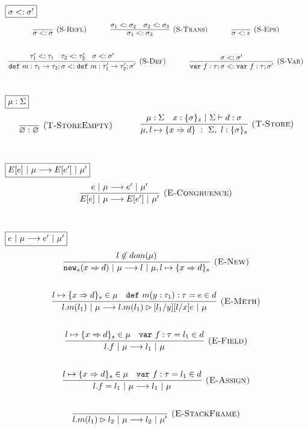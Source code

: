 \documentclass{llncs}
\newcommand{\keywadj}[1]{\mathtt{#1}}
\newcommand{\keyw}[1]{\keywadj{#1}~}
\begin{document}
$\fbox{$\sigma <: \sigma'$}$
\[
\begin{array}{c}
\infer[\textsc{(S-Refl)}]
  {\sigma <: \sigma}
  {}%
~~~~~~~~~~
\infer[\textsc{(S-Trans)}]
  {\sigma_1 <: \sigma_3}
  {\sigma_1 <: \sigma_2 & \sigma_2 <: \sigma_3}%
~~~~~~~~~~
\infer[\textsc{(S-Eps)}]
  {\sigma <: \epsilon}
  {}\\[5ex]

\infer[\textsc{(S-Def)}]
  {\keyw{def} m:\tau_1 \rightarrow \tau_2; \sigma <: \keyw{def} m:\tau_1' \rightarrow \tau_2'; \sigma'}
  {\tau_1' <: \tau_1 & \tau_2 <: \tau_2' & \sigma <: \sigma'}%
~~~~~~~~~~
\infer[\textsc{(S-Var)}]
  {\keyw{var} f:\tau; \sigma <: \keyw{var} f:\tau; \sigma'}
  {\sigma <: \sigma'}\\[5ex]  

\end{array}
\]

$\fbox{$\mu : \Sigma$}$
\[
\begin{array}{c}

\infer[\textsc{(T-StoreEmpty)}]
  {\varnothing : \varnothing}
  {}%
~~~~~~~~~~
\infer[\textsc{(T-Store)}]
  {\mu, l \mapsto \{ x \Rightarrow d \}~:~\Sigma,~l : \{ \sigma \}_s}
  {\mu : \Sigma & x : \{ \sigma \}_s~|~\Sigma \vdash d : \sigma}\\[5ex]

\end{array}
\]

$\fbox{$E[e]~|~\mu \longrightarrow E[e']~|~\mu'$}$
\[
\begin{array}{c}
\infer[\textsc{(E-Congruence)}]
  {E[e]~|~\mu \longrightarrow E[e']~|~\mu'}
  {e~|~\mu \longrightarrow e'~|~\mu'}\\[5ex]  
\end{array}
\]


$\fbox{$e~|~\mu \longrightarrow e'~|~\mu'$}$
\[
\begin{array}{c}
\infer[\textsc{(E-New)}]
  {\keywadj{new}_{s}(x \Rightarrow d)~|~\mu \longrightarrow l~|~\mu, l \mapsto \{ x \Rightarrow d \}_{s}}
  {l \not\in dom(\mu)}\\[5ex]
  
\infer[\textsc{(E-Meth)}]
  {l.m(l_1)~|~\mu \longrightarrow l.m(l_1) \rhd [l_1/y][l/x]e~|~\mu}
  {l \mapsto \{ x \Rightarrow d \}_{s} \in \mu & \keyw{def} m(y : \tau_1) : \tau = e \in d}\\[5ex]

\infer[\textsc{(E-Field)}]
  {l.f~|~\mu \longrightarrow l_1~|~\mu}
  {l \mapsto \{ x \Rightarrow d \}_{s} \in \mu & \keyw{var} f:\tau = l_1 \in d}\\[5ex]

\infer[\textsc{(E-Assign)}]
  {l.f = l_1~|~\mu \longrightarrow l_1~|~\mu}
  {l \mapsto \{ x \Rightarrow d \}_{s} \in \mu & \keyw{var} f:\tau = l_1 \in d}\\[5ex]

\infer[\textsc{(E-StackFrame)}]
  {l.m(l_1) \rhd l_2~|~\mu \longrightarrow l_2~|~\mu'}
  {}\\[5ex]
  
\end{array}
\]
\end{document}
